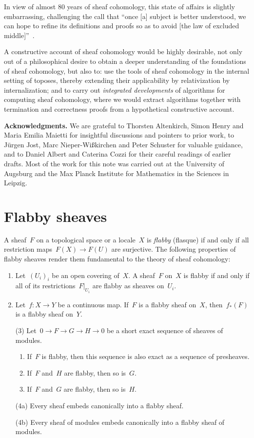 \documentclass[oneside]{amsart}
\theoremstyle{definition}
\theoremstyle{plain}
\theoremstyle{remark}
\renewcommand{\_}{\mathpunct{.}\,}
\begin{document}
In view of almost 80 years of sheaf cohomology, this state of affairs is
slightly embarrassing, challenging the call that ``once [a] subject is better
understood, we can hope to refine its definitions and proofs so as to
avoid [the law of excluded middle]''~\cite[Section~3.4]{hott}.

A constructive account of sheaf cohomology would be highly desirable, not only
out of a philosophical desire to obtain a deeper understanding of the
foundations of sheaf cohomology, but also to: use the tools of sheaf cohomology
in the internal setting of toposes, thereby extending their applicability by
relativization by internalization; and to carry out \emph{integrated
developments} of algorithms for computing sheaf cohomology, where we would
extract algorithms together with termination and correctness proofs from a
hypothetical constructive account.


\textbf{Acknowledgments.} We are grateful to Thorsten Altenkirch, Simon Henry
and Maria Emilia Maietti for insightful discussions and pointers to prior work,
to Jürgen Jost, Marc Nieper-Wißkirchen and Peter Schuster for valuable
guidance, and to Daniel Albert and Caterina Cozzi for their careful readings of
earlier drafts. Most of the work for this note was carried out at the University of
Augsburg and the Max Planck Institute for Mathematics in the Sciences in
Leipzig.


\section{Flabby sheaves}

A sheaf~$F$ on a topological space or a locale~$X$ is \emph{flabby} (flasque) if and only
if all restriction maps~$F(X) \to F(U)$ are surjective. The following
properties of flabby sheaves render them fundamental to the theory of sheaf
cohomology:
\begin{enumerate}
\item Let~$(U_i)_i$ be an open covering of~$X$.
A sheaf~$F$ on~$X$ is flabby if and only if all of its restrictions~$F|_{U_i}$
are flabby as sheaves on~$U_i$.
\item Let~$f : X \to Y$ be a continuous map. If~$F$ is a flabby sheaf on~$X$,
then~$f_*(F)$ is a flabby sheaf on~$Y$.
\item[(3)] Let~$0 \to F \to G \to H \to 0$ be a short exact sequence of sheaves of
modules.
\begin{enumerate}
\item If~$F$ is flabby, then this sequence is also exact as a sequence of
presheaves.
\item If~$F$ and~$H$ are flabby, then so is~$G$.
\item If~$F$ and~$G$ are flabby, then so is~$H$.
\end{enumerate}
\item[(4a)] Every sheaf embeds canonically into a flabby sheaf.
\item[(4b)] Every sheaf of modules embeds canonically into a flabby sheaf of modules.
\end{enumerate}
\end{document}
